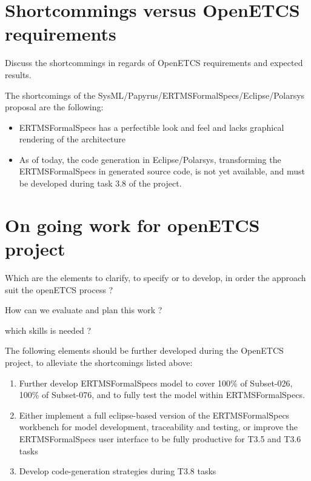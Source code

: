 \section{Shortcommings versus OpenETCS requirements}

\begin{todo_comment}
Discuss the shortcommings in regards of OpenETCS requirements and expected results.
\end{todo_comment}

The shortcomings of the SysML/Papyrus/ERTMSFormalSpecs/Eclipse/Polarsys proposal are the following:

\begin{itemize}
	\item ERTMSFormalSpecs has a perfectible look and feel and lacks graphical rendering of the architecture
	\item As of today, the code generation in Eclipse/Polarsys, transforming the ERTMSFormalSpecs in generated source code, is not yet available, and must be developed during task 3.8 of the project.
\end{itemize}

\section{On going work for openETCS project}

\begin{todo_comment}
Which are the elements to clarify, to specify or to develop, in order the approach suit the openETCS process ?

How can we evaluate and plan this work ?

which skills is needed ?
\end{todo_comment}

The following elements should be further developed during the OpenETCS project, to alleviate the shortcomings listed above:

\begin{enumerate}
	\item Further develop ERTMSFormalSpecs model to cover 100\% of Subset-026, 100\% of Subset-076, and to fully test the model within ERTMSFormalSpecs. 
	\item Either implement a full eclipse-based version of the ERTMSFormalSpecs workbench for model development, traceability and testing, or improve the ERTMSFormalSpecs user interface to be fully productive for T3.5 and T3.6 tasks
	\item Develop code-generation strategies during T3.8 tasks
\end{enumerate}

